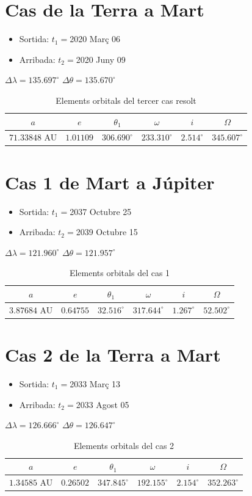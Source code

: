 \section{Cas de la Terra a Mart}
\begin{itemize}
	\item Sortida: $t_{1}=$2020 Març 06
	\item Arribada: $t_{2}=$2020 Juny 09
\end{itemize}
$\Delta\lambda=135.697^{\circ}$
$\Delta\theta=135.670^{\circ}$
\begin{table}[h!]
	\centering
	\begin{tabular}{ |c|c|c|c|c|c|}
		\hline
		$a$ & $e$ & $\theta_{1}$ & $\omega$ & $i$ & $\Omega$ \\ \hline
		$71.33848$ AU  & $1.01109$ & $306.690^{\circ}$ & $233.310^{\circ}$ & $2.514^{\circ}$ & $345.607^{\circ}$ \\ \hline
	\end{tabular}
	\caption{Elements orbitals del tercer cas resolt}
\end{table}

\section{Cas 1 de Mart a Júpiter}
\begin{itemize}
	\item Sortida: $t_{1}=$2037 Octubre 25
	\item Arribada: $t_{2}=$2039 Octubre 15
\end{itemize}
$\Delta\lambda=121.960^{\circ}$
$\Delta\theta=121.957^{\circ}$
\begin{table}[h!]
	\centering
	\begin{tabular}{ |c|c|c|c|c|c|}
		\hline
		$a$ & $e$ & $\theta_{1}$ & $\omega$ & $i$ & $\Omega$ \\ \hline
		$3.87684$ AU  & $0.64755$ & $32.516^{\circ}$ & $317.644^{\circ}$ & $1.267^{\circ}$ & $52.502^{\circ}$ \\ \hline
	\end{tabular}
	\caption{Elements orbitals del cas 1}
\end{table}

\section{Cas 2 de la Terra a Mart}
\begin{itemize}
	\item Sortida: $t_{1}=$2033 Març 13
	\item Arribada: $t_{2}=$2033 Agost 05
\end{itemize}
$\Delta\lambda=126.666^{\circ}$
$\Delta\theta=126.647^{\circ}$
\begin{table}[h!]
	\centering
	\begin{tabular}{ |c|c|c|c|c|c|}
		\hline
		$a$ & $e$ & $\theta_{1}$ & $\omega$ & $i$ & $\Omega$ \\ \hline
		$1.34585$ AU  & $0.26502$ & $347.845^{\circ}$ & $192.155^{\circ}$ & $2.154^{\circ}$ & $352.263^{\circ}$ \\ \hline
	\end{tabular}
	\caption{Elements orbitals del cas 2}
\end{table}

